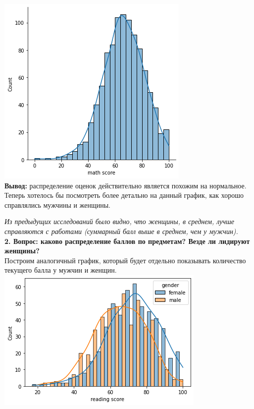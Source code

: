 \documentclass[12pt,a4paper]{article}
\begin{document}
\includegraphics{scores_math} \\

\textbf{Вывод:} распределение оценок действительно является похожим на  нормальное. Теперь хотелось бы посмотреть более детально на данный график, как хорошо справлялись мужчины и женщины.


\textit{Из предыдущих исследований было видно, что женщины, в среднем, лучше справляются с работами (суммарный балл выше в среднем, чем у мужчин).} \\

\textbf{2. Вопрос: каково распределение баллов по предметам? Везде ли лидируют женщины?} \\

Построим аналогичный график, который будет отдельно показывать количество текущего балла у мужчин и женщин.\\


\includegraphics{scores_mf_reading} \\
\end{document}
